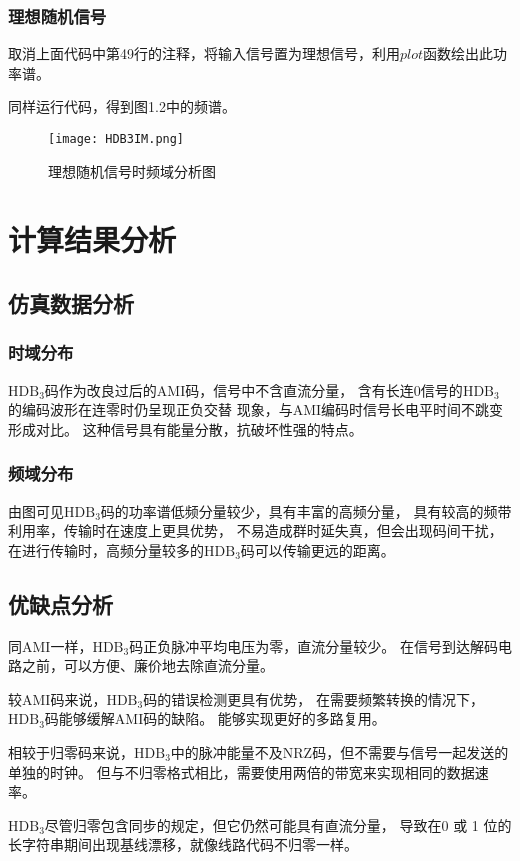 \documentclass[AutoFakeBold]{LZUThesis}
\begin{document}
\newpage

\subsection{理想随机信号}
取消上面代码中第49行的注释，将输入信号置为理想信号，利用$plot$函数绘出此功率谱。

同样运行代码，得到图1.2中的频谱。

\begin{figure}[htbp]
    \centering
    \texttt{[image: HDB3IM.png]}
    \caption{理想随机信号时频域分析图}
\end{figure}

\chapter{计算结果分析}

\section{仿真数据分析}

\subsection{时域分布}
$\mathrm{HDB_3}$码作为改良过后的AMI码，信号中不含直流分量，
含有长连0信号的$\mathrm{HDB_3}$的编码波形在连零时仍呈现正负交替
现象，与AMI编码时信号长电平时间不跳变形成对比。
这种信号具有能量分散，抗破坏性强的特点。

\subsection{频域分布}
    由图可见$\mathrm{HDB_3}$码的功率谱低频分量较少，具有丰富的高频分量，
    具有较高的频带利用率，传输时在速度上更具优势，
    不易造成群时延失真，但会出现码间干扰，
    在进行传输时，高频分量较多的$\mathrm{HDB_3}$码可以传输更远的距离。

\section{优缺点分析}
同AMI一样，$\mathrm{HDB_3}$码正负脉冲平均电压为零，直流分量较少。
在信号到达解码电路之前，可以方便、廉价地去除直流分量。\cite{enwiki:2}

较AMI码来说，$\mathrm{HDB_3}$码的错误检测更具有优势，
在需要频繁转换的情况下，$\mathrm{HDB_3}$码能够缓解AMI码的缺陷。
能够实现更好的多路复用。

相较于归零码来说，$\mathrm{HDB_3}$中的脉冲能量不及NRZ码，但不需要与信号一起发送的单独的时钟。
但与不归零格式相比，需要使用两倍的带宽来实现相同的数据速率。

$\mathrm{HDB_3}$尽管归零包含同步的规定，但它仍然可能具有直流分量，
导致在0 或 1 位的长字符串期间出现基线漂移，就像线路代码不归零一样。



\backmatter


\printbib
\nocite{*} %




\end{document}
